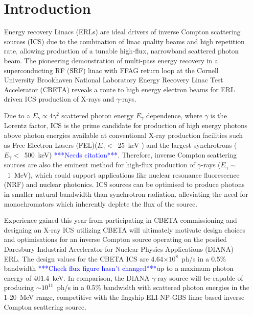 \documentclass[../main.tex]{subfiles}
\begin{document}
\chapter{Introduction}
\label{Introduction} %

Energy recovery Linacs (ERLs) are ideal drivers of inverse Compton scattering sources (ICS) due to the combination of linac quality beams and high repetition rate, allowing production of a tunable high-flux, narrowband scattered photon beam. The pioneering demonstration of multi-pass energy recovery in a superconducting RF (SRF) linac with FFAG return loop at the Cornell University Brookhaven National Laboratory Energy Recovery Linac Test Accelerator (CBETA) \cite{hoffstaetter2017cbeta} reveals a route to high energy electron beams for ERL driven ICS production of X-rays and $\gamma$-rays.

Due to a $E_{\gamma} \propto 4\gamma^{2}$ scattered photon energy $E_{\gamma}$ dependence, where $\gamma$ is the Lorentz factor, ICS is the prime candidate for production of high energy photons above photon energies available at conventional X-ray production facilities such as Free Electron Lasers (FEL)($E_{\gamma} <$~25~keV \cite{schneidmiller2011photon}) and the largest synchrotrons ($E_{\gamma} <$~500~keV) \textcolor{blue}{***Needs citation***}. Therefore, inverse Compton scattering sources are also the eminent method for high-flux production of $\gamma$-rays ($E_{\gamma} \sim$~1~MeV), which could support applications like nuclear resonance fluorescence (NRF) and nuclear photonics. ICS sources can be optimised to produce photons in smaller natural bandwidth than synchrotron radiation, alleviating the need for monochromators which inherently deplete the flux of the source. 

Experience gained this year from participating in CBETA commissioning and designing an X-ray ICS utilizing CBETA will ultimately motivate design choices and optimisations for an inverse Compton source operating on the posited Daresbury Industrial Accelerator for Nuclear Physics Applications (DIANA) ERL. The design values for the CBETA ICS are 4.64$\times 10^{8}$~ph/s in a 0.5\% bandwidth \textcolor{blue}{***Check flux figure hasn't changed***}up to a maximum photon energy of 401.4~keV. In comparison, the DIANA $\gamma$-ray source will be capable of producing $\sim 10^{11}$~ph/s in a 0.5\% bandwidth with scattered photon energies in the 1-20~MeV range, competitive with the flagship ELI-NP-GBS \cite{adriani2014technical} linac based inverse Compton scattering source. 
\end{document}
